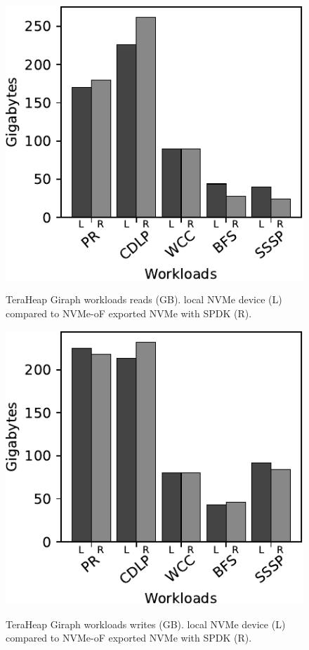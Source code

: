 \vspace{10em}
\begin{figure}[H]
  \includegraphics[width=\linewidth]{figures/giraph_r.pdf}\\
\caption{TeraHeap Giraph workloads reads (GB). local NVMe device (L) compared to NVMe-oF exported NVMe with SPDK (R).}
\label{fig:giraph_r}
\end{figure}

\begin{figure}[H]
  \includegraphics[width=\linewidth]{figures/giraph_w.pdf}\\
\caption{TeraHeap Giraph workloads writes (GB). local NVMe device (L) compared to NVMe-oF exported NVMe with SPDK (R).}
\label{fig:giraph_w}
\end{figure}

